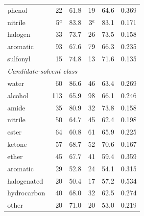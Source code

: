 \begin{longtable}{lrrrrr}
phenol & 22 & 61.8 & 19 & 64.6 & 0.369 \\
nitrile & 5$^{a}$ & 83.8 & 3$^{a}$ & 83.1 & 0.171 \\
halogen & 33 & 73.7 & 26 & 73.5 & 0.158 \\
aromatic & 93 & 67.6 & 79 & 66.3 & 0.235 \\
sulfonyl & 15 & 74.8 & 13 & 71.6 & 0.135 \\
\multicolumn{6}{l}{\textit{Candidate-solvent class}} \\
water & 60 & 86.6 & 46 & 63.4 & 0.269 \\
alcohol & 113 & 65.9 & 98 & 66.1 & 0.246 \\
amide & 35 & 80.9 & 32 & 73.8 & 0.158 \\
nitrile & 50 & 64.7 & 45 & 62.4 & 0.198 \\
ester & 64 & 60.8 & 61 & 65.9 & 0.225 \\
ketone & 57 & 68.7 & 52 & 70.6 & 0.167 \\
ether & 45 & 67.7 & 41 & 59.4 & 0.359 \\
aromatic & 29 & 52.8 & 24 & 54.1 & 0.315 \\
halogenated & 20 & 50.4 & 17 & 57.2 & 0.534 \\
hydrocarbon & 40 & 68.0 & 32 & 62.5 & 0.274 \\
other & 20 & 71.0 & 20 & 53.0 & 0.219 \\
\bottomrule
\end{longtable}
\endgroup
